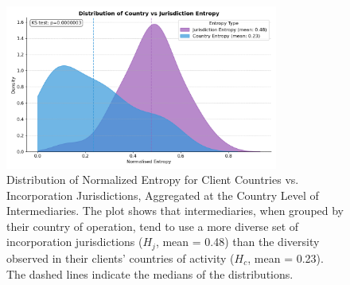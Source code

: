 \begin{figure}[htbp]
    \centering
    \includegraphics[width=0.8\textwidth]{images/Geography_Country_Level_Entropy_Distribution.png}
    \caption{Distribution of Normalized Entropy for Client Countries vs. Incorporation Jurisdictions, Aggregated at the Country Level of Intermediaries. The plot shows that intermediaries, when grouped by their country of operation, tend to use a more diverse set of incorporation jurisdictions ($H_j$, mean = 0.48) than the diversity observed in their clients' countries of activity ($H_c$, mean = 0.23). The dashed lines indicate the medians of the distributions.}
    \label{fig:geography_country_level_entropy_distribution}
\end{figure}

